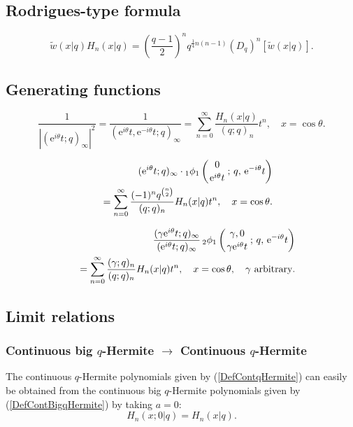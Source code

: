 \documentclass[envcountchap,graybox]{svmono}
\newcounter{rom}
\newcommand{\qhyp}[5]{\mbox{}_{#1}{\phi}_{#2}
\left(\genfrac{}{}{0pt}{}{#3}{#4}\,;\,q,\,#5\right)}
\newcommand{\e}{\textrm{e}}
\begin{document}
\subsection*{Rodrigues-type formula}
\begin{equation}
\label{RodContqHermite}
{\tilde w}(x|q)H_n(x|q)=\left(\frac{q-1}{2}\right)^nq^{\frac{1}{4}n(n-1)}
\left(D_q\right)^n\left[{\tilde w}(x|q)\right].
\end{equation}

\subsection*{Generating functions}
\begin{equation}
\label{GenContqHermite1}
\frac{1}{\left|(\e^{i\theta}t;q)_{\infty}\right|^2}=
\frac{1}{(\e^{i\theta}t,\e^{-i\theta}t;q)_{\infty}}=
\sum_{n=0}^{\infty}\frac{H_n(x|q)}{(q;q)_n}t^n,\quad x=\cos\theta.
\end{equation}

\begin{eqnarray}
\label{GenContqHermite2}
& &(\e^{i\theta}t;q)_{\infty}\cdot\qhyp{1}{1}{0}{\e^{i\theta}t}{\e^{-i\theta}t}\nonumber\\
& &{}=\sum_{n=0}^{\infty}\frac{(-1)^nq^{\binom{n}{2}}}{(q;q)_n}H_n(x|q)t^n,
\quad x=\cos\theta.
\end{eqnarray}

\begin{eqnarray}
\label{GenContqHermite3}
& &\frac{(\gamma\e^{i\theta}t;q)_{\infty}}{(\e^{i\theta}t;q)_{\infty}}\,
\qhyp{2}{1}{\gamma,0}{\gamma\e^{i\theta}t}{\e^{-i\theta}t}\nonumber\\
& &{}=\sum_{n=0}^{\infty}\frac{(\gamma;q)_n}{(q;q)_n}H_n(x|q)t^n,
\quad x=\cos\theta,\quad\textrm{$\gamma$ arbitrary}.
\end{eqnarray}

\subsection*{Limit relations}

\subsubsection*{Continuous big $q$-Hermite $\rightarrow$ Continuous $q$-Hermite}
The continuous $q$-Hermite polynomials given by (\ref{DefContqHermite})
can easily be obtained from the continuous big $q$-Hermite polynomials given by
(\ref{DefContBigqHermite}) by taking $a=0$:
$$H_n(x;0|q)=H_n(x|q).$$
\end{document}
